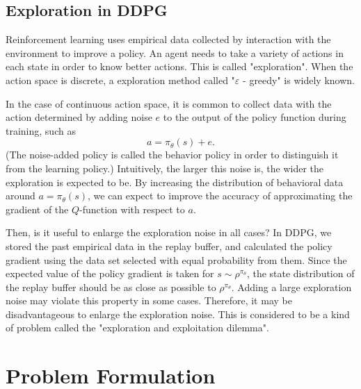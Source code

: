 \documentclass[english, dvipdfmx]{ampmt}             %
\begin{document}
\subsection{Exploration in DDPG}
\label{sec:exploration}
Reinforcement learning uses empirical data collected by interaction with the environment to improve a policy. An agent needs to take a variety of actions in each state in order to know better actions. This is called "exploration". When the action space is discrete, a exploration method called "$\varepsilon$ - greedy" is widely known. \par
In the case of continuous action space, it is common to collect data with the action determined by adding noise $e$ to the output of the policy function during training, such as
\begin{equation}
	a = \pi_{\theta}(s) + e.
\end{equation}
(The noise-added policy is called the behavior policy in order to distinguish it from the learning policy.) Intuitively, the larger this noise is, the wider the exploration is expected to be. By increasing the distribution of behavioral data around $a=\pi_{\theta}(s)$, we can expect to improve the accuracy of approximating the gradient of the $Q$-function with respect to $a$. \par
Then, is it useful to enlarge the exploration noise in all cases? In DDPG, we stored the past empirical data in the replay buffer, and calculated the policy gradient using the data set selected with equal probability from them. Since the expected value of the policy gradient is taken for $s\sim\rho^{\pi_{\theta}}$, the state distribution of the replay buffer should be as close as possible to $\rho^{\pi_{\theta}}$. Adding a large exploration noise may violate this property in some cases. Therefore, it may be disadvantageous to enlarge the exploration noise. This is considered to be a kind of problem called the "exploration and exploitation dilemma".


\section{Problem Formulation}
\end{document}
